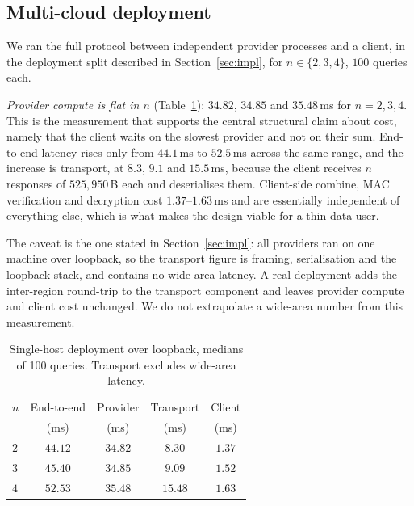 \documentclass[a4paper,fleqn]{cas-sc}
\begin{document}
\subsection{Multi-cloud deployment}
\label{sec:wanresult}
We ran the full protocol between independent provider processes and a client,
in the deployment split described in Section~\ref{sec:impl}, for
$n\in\{2,3,4\}$, $100$ queries each.

\emph{Provider compute is flat in $n$} (Table~\ref{tab:wan}): $34.82$, $34.85$
and $35.48$\,ms for $n=2,3,4$. This is the measurement that supports the
central structural claim about cost, namely that the client waits on the
slowest provider and not on their sum. End-to-end latency rises only from
$44.1$\,ms to $52.5$\,ms across the same range, and the increase is transport,
at $8.3$, $9.1$ and $15.5$\,ms, because the client receives $n$ responses of
$525{,}950$\,B each and deserialises them. Client-side combine, MAC
verification and decryption cost $1.37$--$1.63$\,ms and are essentially
independent of everything else, which is what makes the design viable for a
thin data user.

The caveat is the one stated in Section~\ref{sec:impl}: all providers ran on
one machine over loopback, so the transport figure is framing, serialisation
and the loopback stack, and contains no wide-area latency. A real deployment
adds the inter-region round-trip to the transport component and leaves
provider compute and client cost unchanged. We do not extrapolate a wide-area
number from this measurement.

\begin{table}[pos=htbp]
\caption{Single-host deployment over loopback, medians of 100 queries.
Transport excludes wide-area latency.}
\label{tab:wan}
\centering
\footnotesize
\setlength{\tabcolsep}{3pt}
\renewcommand{\arraystretch}{1.2}
\begin{tabular*}{\tblwidth}{@{\extracolsep{\fill}}lcccc@{}}
\toprule
$n$ & End-to-end & Provider & Transport & Client \\
    & (ms)       & (ms)     & (ms)      & (ms) \\
\midrule
$2$ & $44.12$ & $34.82$ & $8.30$  & $1.37$ \\
$3$ & $45.40$ & $34.85$ & $9.09$  & $1.52$ \\
$4$ & $52.53$ & $35.48$ & $15.48$ & $1.63$ \\
\bottomrule
\end{tabular*}
\end{table}
\end{document}

